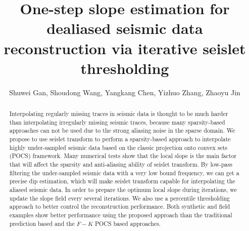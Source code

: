 
\title{One-step slope estimation for dealiased seismic data reconstruction via iterative seislet thresholding}
\renewcommand{\thefootnote}{\fnsymbol{footnote}}

\author{Shuwei Gan\footnotemark[1], Shoudong Wang\footnotemark[1], Yangkang Chen\footnotemark[2], Yizhuo Zhang\footnotemark[3], Zhaoyu Jin\footnotemark[4]}
\address{
\footnotemark[1]
State Key Laboratory of Petroleum Resources and Prospecting \\
China University of Petroleum \\
Fuxue Road 18th\\
Beijing, China, 102200 \\
gsw19900128@126.com\\
\footnotemark[2] Jackson School of Geosciences\\
The University of Texas at Austin\\
University Station, Box X\\
Austin, TX 78713-8924, USA \\
Email: ykchen@utexas.edu\\
\footnotemark[3] Institut de Physique du Globe de Paris (IPGP)\\ 
1 Rue Jussieu\\
75005 Paris, France  \\
Email: yizhuozh@gmail.com\\
\footnotemark[3]School of Geosciences,
University of Edinburgh,
Edinburgh,UK, EH9 3JW,
Email: s1263999@sms.ed.ac.uk
}

\maketitle

\begin{abstract}
Interpolating regularly missing traces in seismic data is thought to be much harder than interpolating irregularly missing seismic traces, because many sparsity-based approaches can not be used due to the strong aliasing noise in the sparse domain. We propose to use seislet transform to perform a sparsity-based approach to interpolate highly under-sampled seismic data based on the classic projection onto convex sets (POCS) framework. Many numerical tests show that the local slope is the main factor that will affect the sparsity and anti-aliasing ability of seislet transform. By low-pass filtering the under-sampled seismic data with a very low bound frequency, we can get a precise dip estimation, which will make seislet transform capable for interpolating the aliased seismic data. In order to prepare the optimum local slope during iterations, we update the slope field every several iterations. We also use a percentile thresholding approach to better control the reconstruction performance. Both synthetic and field examples show better performance using the proposed approach than the traditional prediction based and the $F-K$ POCS based approaches.
\end{abstract}

